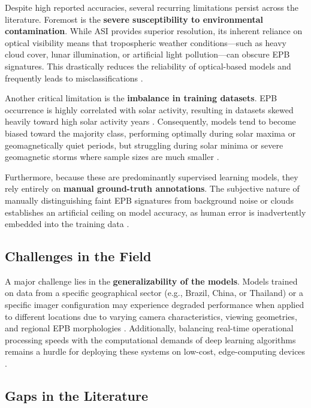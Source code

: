 Despite high reported accuracies, several recurring limitations persist across the literature. Foremost is the \textbf{severe susceptibility to environmental contamination}. While ASI provides superior resolution, its inherent reliance on optical visibility means that tropospheric weather conditions---such as heavy cloud cover, lunar illumination, or artificial light pollution---can obscure EPB signatures. This drastically reduces the reliability of optical-based models and frequently leads to misclassifications \cite{yacoub2025automatic,siddiqui2025enhanced}.

Another critical limitation is the \textbf{imbalance in training datasets}. EPB occurrence is highly correlated with solar activity, resulting in datasets skewed heavily toward high solar activity years \cite{zhong2025automatic,okoh2025bootstrapping}. Consequently, models tend to become biased toward the majority class, performing optimally during solar maxima or geomagnetically quiet periods, but struggling during solar minima or severe geomagnetic storms where sample sizes are much smaller \cite{zhong2025automatic}.

Furthermore, because these are predominantly supervised learning models, they rely entirely on \textbf{manual ground-truth annotations}. The subjective nature of manually distinguishing faint EPB signatures from background noise or clouds establishes an artificial ceiling on model accuracy, as human error is inadvertently embedded into the training data \cite{okoh2025bootstrapping}.

\subsection{Challenges in the Field}\label{subsec:challenges-in-the-field}

A major challenge lies in the \textbf{generalizability of the models}. Models trained on data from a specific geographical sector (e.g., Brazil, China, or Thailand) or a specific imager configuration may experience degraded performance when applied to different locations due to varying camera characteristics, viewing geometries, and regional EPB morphologies \cite{siddiqui2025enhanced}. Additionally, balancing real-time operational processing speeds with the computational demands of deep learning algorithms remains a hurdle for deploying these systems on low-cost, edge-computing devices \cite{thanakulketsarat2023classification,yacoub2025automatic}.

\subsection{Gaps in the Literature}\label{subsec:gaps-in-the-literature}

